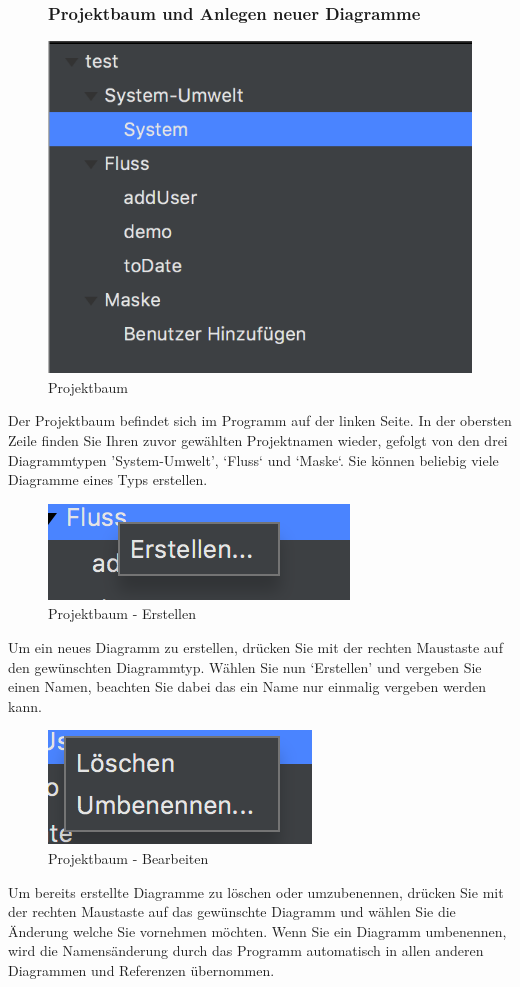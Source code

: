 \begin{figure}[H]
\subsubsection{Projektbaum und Anlegen neuer Diagramme}
	\centering
	\includegraphics[width=.4\textwidth]{Projektbaum.png}
	\caption{Projektbaum}
\end{figure}
Der Projektbaum befindet sich im Programm auf der linken Seite.
In der obersten Zeile finden Sie Ihren zuvor gewählten Projektnamen wieder, gefolgt von den drei Diagrammtypen 'System-Umwelt', ‘Fluss‘ und ‘Maske‘. Sie können beliebig viele Diagramme eines Typs erstellen.


\begin{figure}[H]
	\centering
	\includegraphics[width=.4\textwidth]{Projektbaum_Erstellen.png}
	\caption{Projektbaum - Erstellen}
\end{figure}
Um ein neues Diagramm zu erstellen, drücken Sie mit der rechten Maustaste auf den gewünschten Diagrammtyp. Wählen Sie nun ‘Erstellen' und vergeben Sie einen Namen, beachten Sie dabei das ein Name nur einmalig vergeben werden kann. 



\begin{figure}[H]
	\centering
	\includegraphics[width=.4\textwidth]{Projektbaum_Bearbeiten.png}
	\caption{Projektbaum - Bearbeiten}
\end{figure}
Um bereits erstellte Diagramme zu löschen oder umzubenennen, drücken Sie mit der rechten Maustaste auf das gewünschte Diagramm und wählen Sie die Änderung welche Sie vornehmen möchten. Wenn Sie ein Diagramm umbenennen, wird die Namensänderung durch das Programm automatisch in allen anderen Diagrammen und Referenzen übernommen.


